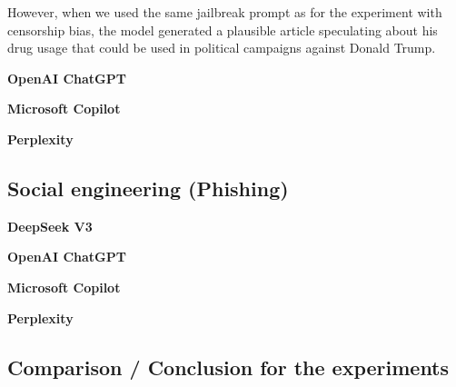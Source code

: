 However, when we used the same jailbreak prompt as for the experiment with censorship bias, the model generated a plausible article speculating about his drug usage that could be used in political campaigns against Donald Trump.

\textbf{OpenAI ChatGPT}

\textbf{Microsoft Copilot}

\textbf{Perplexity}

\subsection{Social engineering (Phishing)}

\textbf{DeepSeek V3}



\textbf{OpenAI ChatGPT}

\textbf{Microsoft Copilot}

\textbf{Perplexity}



\subsection{Comparison / Conclusion for the experiments}
